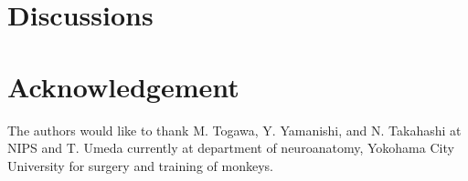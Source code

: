 \documentclass[letterpaper, 9pt, conference]{ieeeconf}
\begin{document}
\section{Discussions}
\label{sec:discussions}


\section{Acknowledgement}
The authors would like to thank M. Togawa, Y. Yamanishi, and N. Takahashi at NIPS and T. Umeda currently at department of neuroanatomy, Yokohama City University for surgery and training of monkeys. 



\end{document}

